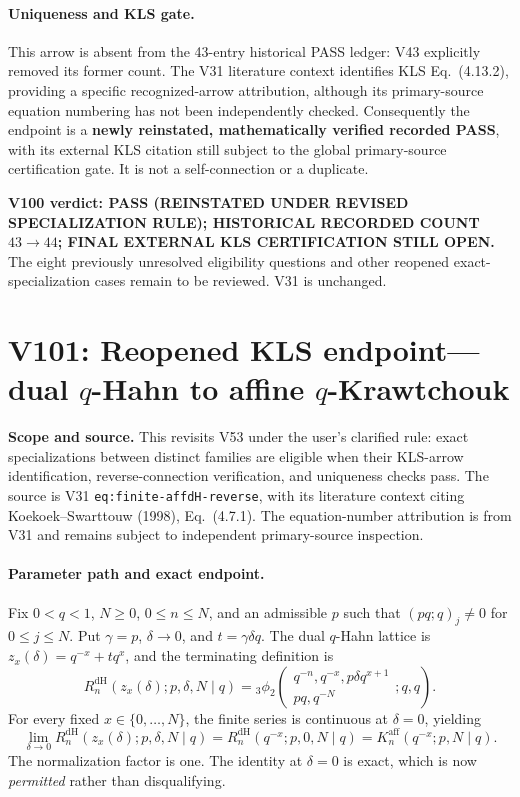 \documentclass[11pt]{article}
\begin{document}
\paragraph{Uniqueness and KLS gate.} This arrow is absent from the 43-entry historical PASS ledger: V43 explicitly removed its former count. The V31 literature context identifies KLS Eq.~(4.13.2), providing a specific recognized-arrow attribution, although its primary-source equation numbering has not been independently checked. Consequently the endpoint is a \textbf{newly reinstated, mathematically verified recorded PASS}, with its external KLS citation still subject to the global primary-source certification gate. It is not a self-connection or a duplicate.

\noindent\textbf{V100 verdict: PASS (REINSTATED UNDER REVISED SPECIALIZATION RULE); HISTORICAL RECORDED COUNT $43\to44$; FINAL EXTERNAL KLS CERTIFICATION STILL OPEN.} The eight previously unresolved eligibility questions and other reopened exact-specialization cases remain to be reviewed. V31 is unchanged.


\section{V101: Reopened KLS endpoint---dual $q$-Hahn to affine $q$-Krawtchouk}
\noindent\textbf{Scope and source.} This revisits V53 under the user's clarified rule: exact specializations between distinct families are eligible when their KLS-arrow identification, reverse-connection verification, and uniqueness checks pass. The source is V31 \texttt{eq:finite-affdH-reverse}, with its literature context citing Koekoek--Swarttouw (1998), Eq.~(4.7.1). The equation-number attribution is from V31 and remains subject to independent primary-source inspection.

\paragraph{Parameter path and exact endpoint.} Fix $0<q<1$, $N\ge0$, $0\le n\le N$, and an admissible $p$ such that $(pq;q)_j\ne0$ for $0\le j\le N$. Put $\gamma=p$, $\delta\to0$, and $t=\gamma\delta q$. The dual $q$-Hahn lattice is $z_x(\delta)=q^{-x}+tq^x$, and the terminating definition is
\[
 R_n^{\mathrm{dH}}(z_x(\delta);p,\delta,N\mid q)
 ={}_3\phi_2\!\left(\begin{matrix}q^{-n},q^{-x},p\delta q^{x+1}\\pq,q^{-N}\end{matrix};q,q\right).
\]
For every fixed $x\in\{0,\ldots,N\}$, the finite series is continuous at $\delta=0$, yielding
\begin{equation}\label{eq:v101-dh-aff}
 \boxed{\lim_{\delta\to0}R_n^{\mathrm{dH}}(z_x(\delta);p,\delta,N\mid q)
 =R_n^{\mathrm{dH}}(q^{-x};p,0,N\mid q)
 =K_n^{\mathrm{aff}}(q^{-x};p,N\mid q).}
\end{equation}
The normalization factor is one. The identity at $\delta=0$ is exact, which is now \emph{permitted} rather than disqualifying.
\end{document}
